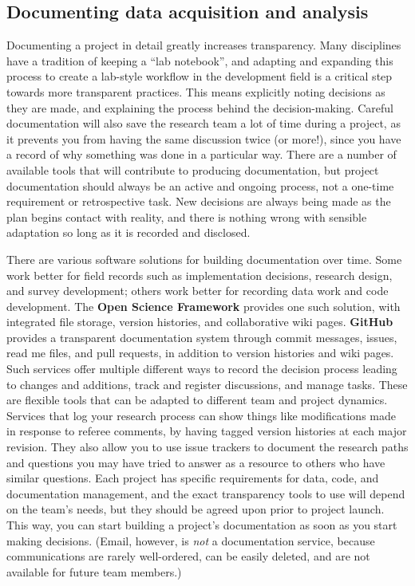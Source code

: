 \subsection{Documenting data acquisition and analysis}

Documenting a project in detail greatly increases transparency.
Many disciplines have a tradition of keeping a ``lab notebook'',
and adapting and expanding this process to create a
lab-style workflow in the development field is a
critical step towards more transparent practices.
This means explicitly noting decisions as they are made,
and explaining the process behind the decision-making.
Careful documentation will also save the research team a lot of time during a project,
as it prevents you from having the same discussion twice (or more!),
since you have a record of why something was done in a particular way.
There are a number of available tools
that will contribute to producing documentation,
but project documentation should always be an active and ongoing process,
not a one-time requirement or retrospective task.
New decisions are always being made as the plan begins contact with reality,
and there is nothing wrong with sensible adaptation so long as it is recorded and disclosed.

There are various software solutions for building documentation over time.
Some work better for field records such as implementation decisions,
research design, and survey development;
others work better for recording data work and code development.
The \textbf{Open Science Framework} provides one such solution,
with integrated file storage, version histories, and collaborative wiki pages.
\textbf{GitHub} provides a transparent documentation system
through commit messages, issues, read me files, and pull requests,
in addition to version histories and wiki pages.
Such services offer multiple different ways
to record the decision process leading to changes and additions,
track and register discussions, and manage tasks.
These are flexible tools that can be adapted to different team and project dynamics.
Services that log your research process can show things like modifications made in response to referee comments,
by having tagged version histories at each major revision.
They also allow you to use issue trackers
to document the research paths and questions you may have tried to answer
as a resource to others who have similar questions.
Each project has specific requirements for data, code, and documentation management,
and the exact transparency tools to use will depend on the team's needs,
but they should be agreed upon prior to project launch.
This way, you can start building a project's documentation as soon as you start making decisions.
(Email, however, is \textit{not} a documentation service, because communications are rarely well-ordered,
can be easily deleted, and are not available for future team members.)


